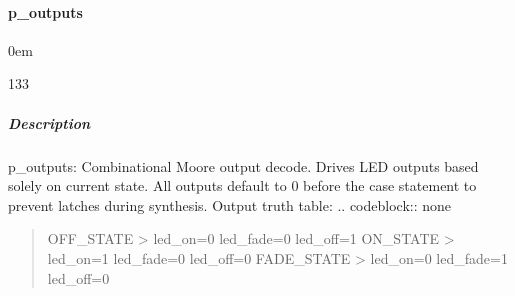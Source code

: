\documentclass[letterpaper,10pt,english]{sphinxmanual}
\begin{document}
\sphinxstepscope


\paragraph{p\_outputs}
\label{\detokenize{modules/blinky/processes/p_outputs:p-outputs}}\label{\detokenize{modules/blinky/processes/p_outputs::doc}}
\begin{DUlineblock}{0em}
\item[]  
\item[]  133
\item[]  
\item[]  
\end{DUlineblock}


\subparagraph{Description}
\label{\detokenize{modules/blinky/processes/p_outputs:description}}
\sphinxAtStartPar
p\_outputs: Combinational Moore output decode.
Drives LED outputs based solely on current state.
All outputs default to 0 before the case statement to
prevent latches during synthesis.
Output truth table:
.. code\sphinxhyphen{}block:: none
\begin{quote}

\sphinxAtStartPar
OFF\_STATE  \sphinxhyphen{}\textgreater{} led\_on=0 led\_fade=0 led\_off=1
ON\_STATE   \sphinxhyphen{}\textgreater{} led\_on=1 led\_fade=0 led\_off=0
FADE\_STATE \sphinxhyphen{}\textgreater{} led\_on=0 led\_fade=1 led\_off=0
\end{quote}

\noindent{}
\end{document}
